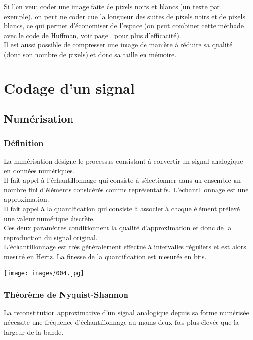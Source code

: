 \documentclass[a4paper,10pt]{book}
\begin{document}
Si l'on veut coder une image faite de pixels noirs et blancs (un texte par exemple), on peut ne coder que la longueur des suites de pixels noirs et de pixels blancs, ce qui permet d'économiser de l'espace (on peut combiner cette méthode avec le code de Huffman, voir page \pageref{Huffman}, pour plus d'efficacité).\\

Il est aussi possible de compresser une image de manière à réduire sa qualité (donc son nombre de pixels) et donc sa taille en mémoire.

\newpage

\section{Codage d'un signal}
\subsection{Numérisation}
\subsubsection{Définition}
La numérisation désigne le processus consistant à convertir un signal analogique en données numériques.\\

Il fait appel à l’échantillonnage qui consiste à sélectionner dans un ensemble un nombre fini d’éléments considérés
comme représentatifs. L’échantillonnage est une approximation.\\

Il fait appel à la quantification qui consiste à associer à chaque élément prélevé une valeur numérique discrète.\\

Ces deux paramètres conditionnent la qualité d’approximation et donc de la reproduction du signal original.\\

L’échantillonnage est très généralement effectué à intervalles réguliers et est alors mesuré en Hertz. La finesse de la quantification est mesurée en bits.

\begin{center} \texttt{[image: images/004.jpg]} \end{center}

\subsubsection{Théorème de Nyquist-Shannon}
La reconstitution approximative d’un signal analogique depuis sa forme numérisée nécessite une fréquence d’échantillonnage au moins deux fois plus élevée que la largeur de la bande.
\end{document}
